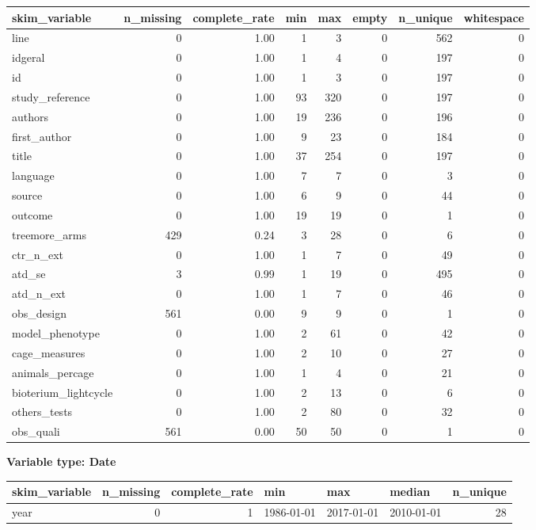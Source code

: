 \documentclass[
]{article}
\begin{document}
\begin{longtable}[]{@{}lrrrrrrr@{}}
\toprule
skim\_variable & n\_missing & complete\_rate & min & max & empty &
n\_unique & whitespace \\
\midrule
\endhead
line & 0 & 1.00 & 1 & 3 & 0 & 562 & 0 \\
idgeral & 0 & 1.00 & 1 & 4 & 0 & 197 & 0 \\
id & 0 & 1.00 & 1 & 3 & 0 & 197 & 0 \\
study\_reference & 0 & 1.00 & 93 & 320 & 0 & 197 & 0 \\
authors & 0 & 1.00 & 19 & 236 & 0 & 196 & 0 \\
first\_author & 0 & 1.00 & 9 & 23 & 0 & 184 & 0 \\
title & 0 & 1.00 & 37 & 254 & 0 & 197 & 0 \\
language & 0 & 1.00 & 7 & 7 & 0 & 3 & 0 \\
source & 0 & 1.00 & 6 & 9 & 0 & 44 & 0 \\
outcome & 0 & 1.00 & 19 & 19 & 0 & 1 & 0 \\
treemore\_arms & 429 & 0.24 & 3 & 28 & 0 & 6 & 0 \\
ctr\_n\_ext & 0 & 1.00 & 1 & 7 & 0 & 49 & 0 \\
atd\_se & 3 & 0.99 & 1 & 19 & 0 & 495 & 0 \\
atd\_n\_ext & 0 & 1.00 & 1 & 7 & 0 & 46 & 0 \\
obs\_design & 561 & 0.00 & 9 & 9 & 0 & 1 & 0 \\
model\_phenotype & 0 & 1.00 & 2 & 61 & 0 & 42 & 0 \\
cage\_measures & 0 & 1.00 & 2 & 10 & 0 & 27 & 0 \\
animals\_percage & 0 & 1.00 & 1 & 4 & 0 & 21 & 0 \\
bioterium\_lightcycle & 0 & 1.00 & 2 & 13 & 0 & 6 & 0 \\
others\_tests & 0 & 1.00 & 2 & 80 & 0 & 32 & 0 \\
obs\_quali & 561 & 0.00 & 50 & 50 & 0 & 1 & 0 \\
\bottomrule
\end{longtable}

\textbf{Variable type: Date}

\begin{longtable}[]{@{}lrrlllr@{}}
\toprule
skim\_variable & n\_missing & complete\_rate & min & max & median &
n\_unique \\
\midrule
\endhead
year & 0 & 1 & 1986-01-01 & 2017-01-01 & 2010-01-01 & 28 \\
\bottomrule
\end{longtable}
\end{document}
